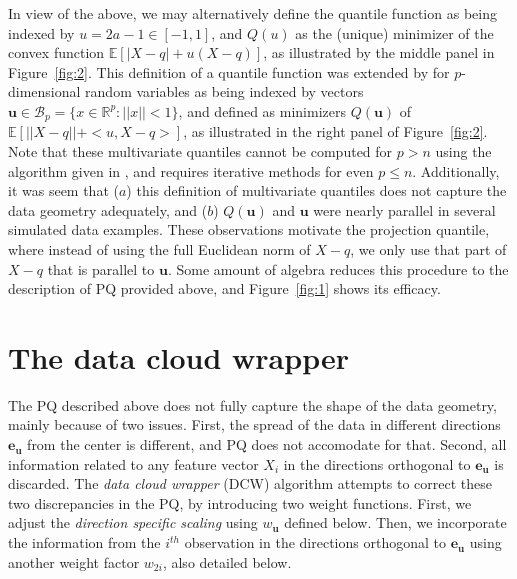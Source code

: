 \documentclass[twoside]{article}
\newcommand{\mbfeu}{\mathbf{e}_{\mathbf u} }
\begin{document}
In view of the above, we may alternatively define the quantile 
function as being indexed by $u = 2 a - 1 \in [-1, 1]$, and $Q (u)$ as the 
(unique) minimizer of the convex function 
$\mathbb{E} \left[ | X - q| + u (X - q) \right]$, as illustrated by the 
middle panel in Figure~\ref{fig:2}. This definition of a quantile function was extended 
by \cite{Chaudhuri96} for $p$-dimensional random variables as being indexed 
by vectors 
 $\mathbf{u} \in \mathcal{B}_{p} = \{ x  \in \mathbb{R}^{p}: || x || < 1 \}$, and 
 defined as minimizers $Q (\mathbf{u} )$ of 
$\mathbb{E} \left[ || X - q|| + <u,  X - q> \right]$, as illustrated in the 
right panel of Figure~\ref{fig:2}. Note that these multivariate quantiles cannot be 
computed for $p > n$ using the algorithm given in \cite{Chaudhuri96}, and requires
iterative methods for even $p \leq n$. 
Additionally, it was seem that ($a$) this definition of 
multivariate quantiles does not capture the data geometry adequately, and ($b$) 
$Q (\mathbf{u})$ and $\mathbf{u}$ were nearly parallel in several simulated data examples. 
These observations motivate the projection quantile, where instead of using 
the full Euclidean norm of $X - q$, we only use that part of $X - q$ that is parallel 
to $\mathbf{u}$. Some amount of algebra reduces this procedure to the description 
of PQ provided above, and Figure~\ref{fig:1} shows its efficacy. 


 
 
 \section{The data cloud wrapper}
 \label{sec:DCWTheory}
 
The PQ described above does not fully capture the shape of the data geometry, 
mainly because of two issues. First, the spread of the data in different directions 
$\mbfeu$ from the center is different, and PQ does not accomodate for that. Second, 
all information  related to any feature vector $X_{i}$ in the directions orthogonal 
to $\mbfeu$ is discarded. The {\it data cloud wrapper} (DCW) algorithm attempts 
to correct these two discrepancies in the PQ, by introducing two weight functions. 
First, we adjust the {\it direction specific scaling} using $w_{\mathbf{u}}$ 
defined below. Then, we incorporate the information from the $i^{th}$  observation 
in the directions orthogonal to $\mbfeu$ using another weight factor $w_{2i}$, also 
detailed below.
 
\end{document}
